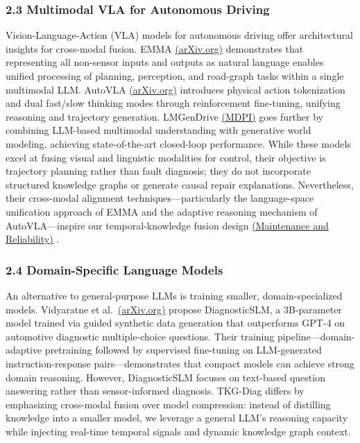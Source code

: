 \documentclass[
  11pt,
]{article}
\begin{document}
\subsubsection{2.3 Multimodal VLA for Autonomous
Driving}\label{multimodal-vla-for-autonomous-driving}

Vision-Language-Action (VLA) models for autonomous driving offer
architectural insights for cross-modal fusion. EMMA
\href{https://arxiv.org/html/2310.11511v1}{(arXiv.org)} demonstrates
that representing all non-sensor inputs and outputs as natural language
enables unified processing of planning, perception, and road-graph tasks
within a single multimodal LLM. AutoVLA
\href{https://arxiv.org/html/2511.21748v1}{(arXiv.org)} introduces
physical action tokenization and dual fast/slow thinking modes through
reinforcement fine-tuning, unifying reasoning and trajectory generation.
LMGenDrive \href{https://www.mdpi.com/2075-1702/12/10/716}{(MDPI)} goes
further by combining LLM-based multimodal understanding with generative
world modeling, achieving state-of-the-art closed-loop performance.
While these models excel at fusing visual and linguistic modalities for
control, their objective is trajectory planning rather than fault
diagnosis; they do not incorporate structured knowledge graphs or
generate causal repair explanations. Nevertheless, their cross-modal
alignment techniques---particularly the language-space unification
approach of EMMA and the adaptive reasoning mechanism of
AutoVLA---inspire our temporal-knowledge fusion design
\href{https://ein.org.pl/Analysis-of-Fault-Events-in-Rail-Transit-Vehicle-Traction-Systems-Based-on-Knowledge,192171,0,2.html}{(Maintenance
and Reliability)} .

\subsubsection{2.4 Domain-Specific Language
Models}\label{domain-specific-language-models}

An alternative to general-purpose LLMs is training smaller,
domain-specialized models. Vidyaratne et
al.~\href{https://arxiv.org/pdf/2507.15025}{(arXiv.org)} propose
DiagnosticSLM, a 3B-parameter model trained via guided synthetic data
generation that outperforms GPT-4 on automotive diagnostic
multiple-choice questions. Their training pipeline---domain-adaptive
pretraining followed by supervised fine-tuning on LLM-generated
instruction-response pairs---demonstrates that compact models can
achieve strong domain reasoning. However, DiagnosticSLM focuses on
text-based question answering rather than sensor-informed diagnosis.
TKG-Diag differs by emphasizing cross-modal fusion over model
compression: instead of distilling knowledge into a smaller model, we
leverage a general LLM's reasoning capacity while injecting real-time
temporal signals and dynamic knowledge graph context.
\end{document}
